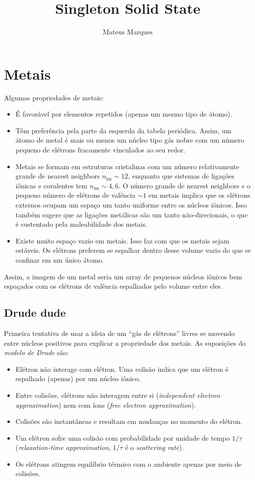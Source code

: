 \documentclass[a4paper,fleqn,12pt]{article}
\title{\Huge{\textbf{Singleton Solid State}}}
\author{Mateus Marques}
\begin{document}
\maketitle

\section{Metais}

Algumas propriedades de metais:
\begin{itemize}
\item É favorável por elementos repetidos (apenas um mesmo tipo de átomo).
\item Têm preferência pela parte da esquerda da tabela periódica. Assim, um átomo de metal é mais ou menos um núcleo tipo gás nobre com um número pequeno de elétrons fracamente vinculados ao seu redor.
\item Metais se formam em estruturas cristalinas com um número relativamente grande de nearest neighbors $n_{\text{nn}} \sim 12$, enquanto que sistemas de ligações iônicas e covalentes tem $n_{\text{nn}} \sim 4, 6$. O número grande de nearest neighbors e o pequeno número de elétrons de valência $\sim 1$ em metais implica que os elétrons externos ocupam um espaço um tanto uniforme entre os núcleos iônicos. Isso também sugere que as ligações metálicas são um tanto não-direcionais, o que é sustentado pela maleabilidade dos metais.
\item Existe muito espaço vazio em metais. Isso faz com que os metais sejam estáveis. Os elétrons preferem se espalhar dentro desse volume vazio do que se confinar em um único átomo.
\end{itemize}
Assim, a imagem de um metal seria um array de pequenos núcleos iônicos bem espaçados com os elétrons de valência espalhados pelo volume entre eles.

\subsection{Drude dude}

Primeira tentativa de usar a ideia de um ``gás de elétrons'' livres se movendo entre núcleos positivos para explicar a propriedade dos metais. As suposições do \textit{modelo de Drude} são:
\begin{itemize}
\item Elétron não interage com elétron. Uma colisão indica que um elétron é espalhado (apenas) por um núcleo iônico.
\item Entre colisões, elétrons não interagem entre si (\textit{independent electron approximation}) nem com íons (\textit{free electron approximation}).
\item Colisões são instantâneas e resultam em mudanças no momento do elétron.
\item Um elétron sofre uma colisão com probabilidade por unidade de tempo $1/\tau$ (\textit{relaxation-time approximation}, $1/\tau$ é o \textit{scattering rate}).
\item Os elétrons atingem equilíbrio térmico com o ambiente apenas por meio de colisões.
\end{itemize}
\end{document}
